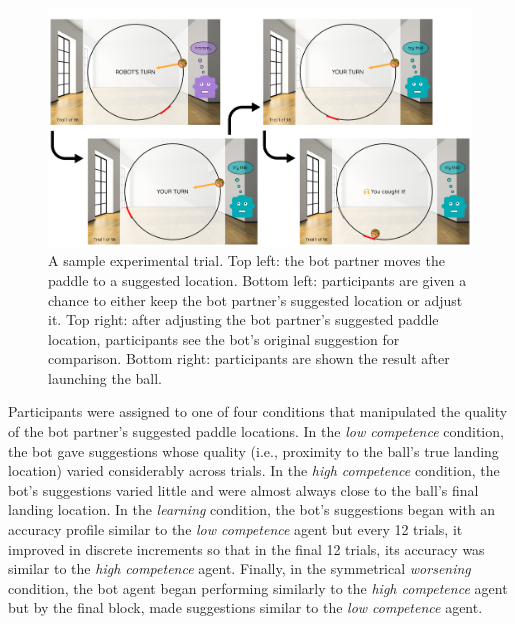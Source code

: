 \documentclass[10pt,letterpaper]{article}
\begin{document}
\begin{figure}[H]
\begin{center}
\includegraphics[width=\linewidth]{img/stimulus_overview.png}
\end{center}
\caption{A sample experimental trial. Top left: the bot partner moves the paddle to a suggested location. Bottom left: participants are given a chance to either keep the bot partner's suggested location or adjust it. Top right: after adjusting the bot partner's suggested paddle location, participants see the bot's original suggestion for comparison. Bottom right: participants are shown the result after launching the ball.} 
\label{fig:stim}
\end{figure}


Participants were assigned to one of four conditions that manipulated the quality of the bot partner's suggested paddle locations. In the \textit{low competence} condition, the bot gave suggestions whose quality (i.e., proximity to the ball's true landing location) varied considerably across trials. In the \textit{high competence} condition, the bot's suggestions varied little and were almost always close to the ball's final landing location. In the \textit{learning} condition, the bot's suggestions began with an accuracy profile similar to the \textit{low competence} agent but every 12 trials, it improved in discrete increments so that in the final 12 trials, its accuracy was similar to the \textit{high competence} agent. Finally, in the symmetrical \textit{worsening} condition, the bot agent began performing similarly to the \textit{high competence} agent but by the final block, made suggestions similar to the \textit{low competence} agent.
\end{document}
